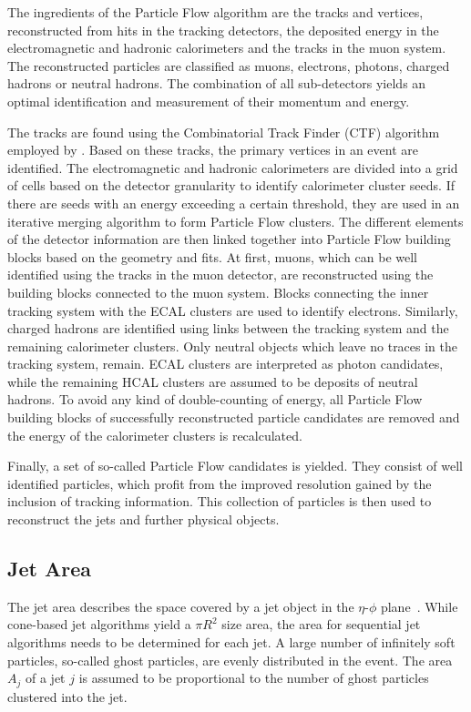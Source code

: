 The ingredients of the Particle Flow algorithm are the
tracks and vertices, reconstructed from hits in the tracking detectors, the
deposited energy in the electromagnetic and hadronic calorimeters and the tracks
in the muon system. The reconstructed particles are classified as muons,
electrons, photons, charged hadrons or neutral hadrons. The combination of all
sub-detectors yields an optimal identification and measurement of their momentum
and energy.

The tracks are found using the Combinatorial Track Finder (CTF)
algorithm~\cite{Adam:2005cg} employed by \CMS. Based on these tracks, the primary
vertices in an event are identified. The electromagnetic and hadronic
calorimeters are divided into a grid of cells based on the detector granularity
to identify calorimeter cluster seeds. If there are seeds with an energy
exceeding a certain threshold, they are used in an iterative merging algorithm
to form Particle Flow clusters. The different elements of the detector
information are then linked together into Particle Flow building blocks based on
the geometry and \chisq fits. At first, muons, which can be well identified
using the tracks in the muon detector, are reconstructed using the building
blocks connected to the muon system. Blocks connecting the inner
tracking system with the ECAL clusters are used to identify electrons.
Similarly, charged hadrons are identified using links between the
tracking system and the remaining calorimeter clusters. Only neutral objects
which leave no traces in the tracking system, remain. ECAL clusters are
interpreted as photon candidates, while the remaining HCAL clusters are assumed
to be deposits of neutral hadrons. To avoid any kind of double-counting of
energy, all Particle Flow building blocks of successfully reconstructed particle
candidates are removed and the energy of the calorimeter clusters is recalculated.

Finally, a set of so-called Particle Flow candidates is yielded. They consist of
well identified particles, which profit from the improved resolution gained by
the inclusion of tracking information. This collection of particles is then
used to reconstruct the jets and further physical objects.

\subsection{Jet Area}

The jet area describes the space covered by a jet object in the $\eta$-$\phi$
plane~\cite{Cacciari:2008gn}. While cone-based jet algorithms yield a $\pi R^2$
size area, the area for sequential jet algorithms needs to be determined for
each jet. A large number of infinitely soft particles, so-called ghost
particles, are evenly distributed in the event. The area $A_j$ of a jet $j$ is
assumed to be proportional to the number of ghost particles clustered into the
jet. 

